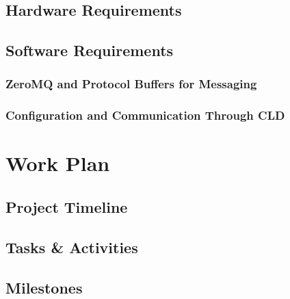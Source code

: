 \documentclass[11pt]{article}
\begin{document}
    \subsection{Hardware Requirements}\label{sec:soln-tech-hw}

    \subsection{Software Requirements}\label{sec:soln-tech-sw}

      \subsubsection{ZeroMQ and Protocol Buffers for Messaging}\label{sec:soln-tech-sw-msg}


      \subsubsection{Configuration and Communication Through CLD}\label{sec:soln-tech-cld}


  \section{Work Plan}\label{sec:plan}

    \subsection{Project Timeline}\label{sec:plan-time}


    \subsection{Tasks \& Activities}\label{sec:plan-tasks}


    \subsection{Milestones}\label{sec:plan-milestones}
\end{document}
